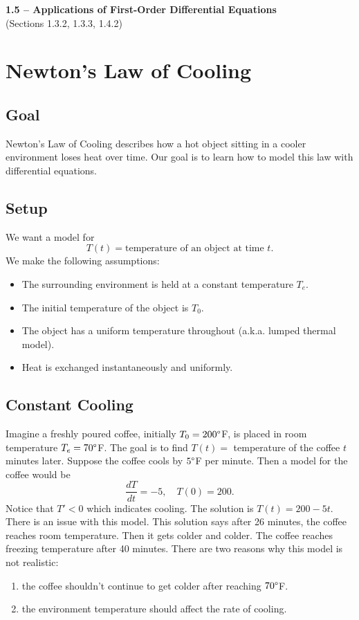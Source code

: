 \documentclass[09pt,letterpaper]{article}
\begin{document}
\begin{center}
\Large\textbf{1.5 – Applications of First-Order Differential Equations}\\
\normalsize (Sections 1.3.2, 1.3.3, 1.4.2)
\end{center}

\section{Newton's Law of Cooling}

\subsection{Goal}
Newton's Law of Cooling describes how a hot object sitting in a cooler environment loses heat over time. Our goal is to learn how to model this law with differential equations. 


\subsection{Setup}
We want a model for 
\[
T(t) = \text{temperature of an object at time } t.
\]
We make the following assumptions:
\begin{itemize}
    \item The surrounding environment is held at a constant temperature $T_e$.
    \item The initial temperature of the object is $T_0$. 
    \item The object has a uniform temperature throughout (a.k.a. lumped thermal model).
    \item Heat is exchanged instantaneously and uniformly.
\end{itemize}

\subsection{Constant Cooling}
Imagine a freshly poured coffee, initially $T_0=200\degree $F, is placed in room temperature $T_e=70\degree $F. The goal is to find $T(t) = $ temperature of the coffee $t$ minutes later. Suppose the coffee cools by $5\degree $F per minute. Then a model for the coffee would be 
$$
    \frac{dT}{dt} = -5, \quad T(0)=200.
$$
Notice that $T'<0$ which indicates cooling. The solution is $T(t)=200-5t$. There is an issue with this model. This solution says after 26 minutes, the coffee reaches room temperature. Then it gets colder and colder. The coffee reaches freezing temperature after 40 minutes. There are two reasons why this model is not realistic:
\begin{enumerate}
    \item the coffee shouldn't continue to get colder after reaching $70\degree $F.
    \item the environment temperature should affect the rate of cooling.
\end{enumerate}
\end{document}
